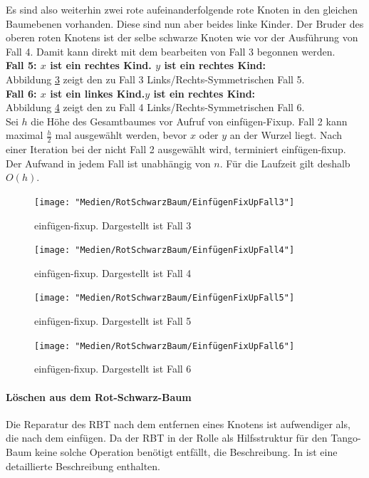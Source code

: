 \documentclass[a4paper,12pt]{article}
\begin{document}
\noindent Es sind also weiterhin zwei rote aufeinanderfolgende rote Knoten in den gleichen Baumebenen vorhanden. Diese sind nun aber beides linke Kinder. Der Bruder des oberen roten Knotens ist der selbe schwarze Knoten wie vor der Ausführung von Fall 4. Damit kann direkt mit dem bearbeiten von Fall 3 begonnen werden.\\

\noindent\textbf{Fall 5: $x$ ist ein rechtes Kind. $y$ ist ein rechtes Kind: }\\ 
	Abbildung \ref{fig:EinfügenFixUpFall5} zeigt den zu Fall 3 Links/Rechts-Symmetrischen Fall 5.\\
\noindent\textbf{Fall 6:  $x$ ist ein linkes Kind.$y$ ist ein rechtes Kind: }\\ 
    Abbildung \ref{fig:EinfügenFixUpFall6} zeigt den zu Fall 4 Links/Rechts-Symmetrischen Fall 6.\\



\noindent  Sei $h$ die Höhe des Gesamtbaumes vor Aufruf von einfügen-Fixup. Fall 2 kann maximal $\frac{h}{2}$ mal ausgewählt werden, bevor $x$ oder $y$ an der Wurzel liegt. Nach einer Iteration bei der nicht Fall 2 ausgewählt wird, terminiert einfügen-fixup. Der Aufwand in jedem Fall ist unabhängig von $n$. Für die Laufzeit gilt deshalb $\mathit{O(h)}$.
\begin{figure}[H]
	\centering
	\texttt{[image: "Medien/RotSchwarzBaum/EinfügenFixUpFall3"]}
	\caption{einfügen-fixup. Dargestellt ist Fall 3  }
	\label{fig:EinfügenFixUpFall3}
\end{figure}

\begin{figure}[h]
	\centering
	\texttt{[image: "Medien/RotSchwarzBaum/EinfügenFixUpFall4"]}
	\caption{einfügen-fixup. Dargestellt ist Fall 4  }
	\label{fig:EinfügenFixUpFall4}
\end{figure}

\begin{figure}[H]
	\centering
	\texttt{[image: "Medien/RotSchwarzBaum/EinfügenFixUpFall5"]}
	\caption{einfügen-fixup. Dargestellt ist Fall 5  }
	\label{fig:EinfügenFixUpFall5}
\end{figure}
\begin{figure}[H]
	\centering
	\texttt{[image: "Medien/RotSchwarzBaum/EinfügenFixUpFall6"]}
	\caption{einfügen-fixup. Dargestellt ist Fall 6  }
	\label{fig:EinfügenFixUpFall6}
\end{figure}   
\paragraph{Löschen aus dem Rot-Schwarz-Baum}
Die Reparatur des RBT nach dem entfernen eines Knotens ist aufwendiger als, die nach dem einfügen. Da der RBT in der Rolle als Hilfsstruktur für den Tango-Baum keine solche Operation benötigt entfällt, die Beschreibung. In \cite{algEinf} ist eine detaillierte Beschreibung enthalten. 
\end{document}
